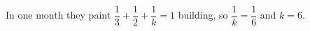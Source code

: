 In one month they paint $\dfrac13+\dfrac12+\dfrac1k=1$ building, so $\dfrac1k=\dfrac16$ and $k=\boxed{6}$.
